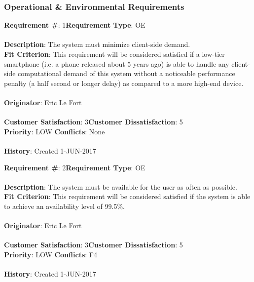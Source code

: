 \documentclass[titlepage]{article}
\begin{document}
\subsubsection{Operational \& Environmental Requirements}
\begin{framed}
	\noindent\textbf{Requirement \#}: 1\hfill \textbf{Requirement Type}: OE\hfill\\\\
	\noindent\textbf{Description}: The system must minimize client-side demand.\\
	\textbf{Fit Criterion}: This requirement will be considered satisfied if a low-tier smartphone (i.e. a phone released about 5 years ago) is able to handle any client-side computational demand of this system without a noticeable performance penalty (a half second or longer delay) as compared to a more high-end device.\\\\
	\textbf{Originator}: Eric Le Fort\\\\
	\noindent\textbf{Customer Satisfaction}: 3\hfill \textbf{Customer Dissatisfaction}: 5\hfill\\
	\textbf{Priority}: LOW \hfill \textbf{Conflicts}: None\hfill\\\\
	\noindent\textbf{History}: Created 1-JUN-2017
\end{framed}
\begin{framed}
	\noindent\textbf{Requirement \#}: 2\hfill \textbf{Requirement Type}: OE\hfill\\\\
	\noindent\textbf{Description}: The system must be available for the user as often as possible.\\
	\textbf{Fit Criterion}: This requirement will be considered satisfied if the system is able to achieve an availability level of 99.5\%.\\\\
	\textbf{Originator}: Eric Le Fort\\\\
	\noindent\textbf{Customer Satisfaction}: 3\hfill \textbf{Customer Dissatisfaction}: 5\hfill\\
	\textbf{Priority}: LOW \hfill \textbf{Conflicts}: F4\hfill\\\\
	\noindent\textbf{History}: Created 1-JUN-2017
\end{framed}
\newpage
\end{document}
